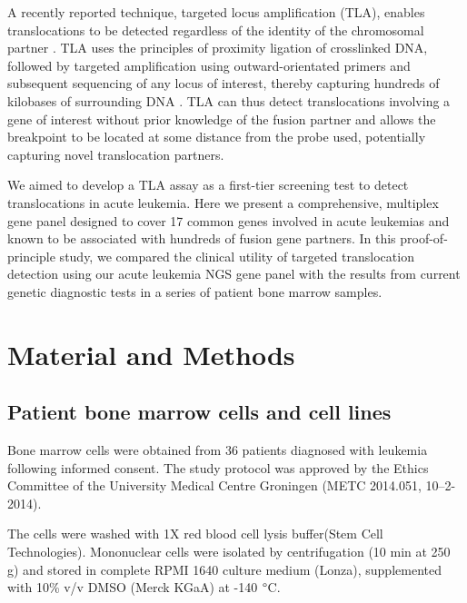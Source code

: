 A recently reported technique, targeted locus amplification (TLA), enables translocations to be detected regardless of the identity of the chromosomal partner \cite{de_Vree_2014}. 
TLA uses the principles of proximity ligation of crosslinked DNA, followed by targeted amplification using outward-orientated primers and subsequent sequencing of any locus of interest, thereby capturing hundreds of kilobases of surrounding DNA \cite{de_Vree_2014}.
TLA can thus detect translocations involving a gene of interest without prior knowledge of the fusion partner and allows the breakpoint to be located at some distance from the probe used, potentially capturing novel translocation partners. 

We aimed to develop a TLA assay as a first-tier screening test to detect translocations in acute leukemia. 
Here we present a comprehensive, multiplex gene panel designed to cover 17 common genes involved in acute leukemias and known to be associated with hundreds of fusion gene partners. 
In this proof-of-principle study, we compared the clinical utility of targeted translocation detection using our acute leukemia NGS gene panel with the results from current genetic diagnostic tests in a series of patient bone marrow samples.


\section{Material and Methods}\label{Material and Methods}

\subsection{Patient bone marrow cells and cell lines}
Bone marrow cells were obtained from 36 patients diagnosed with leukemia following informed consent.
The study protocol was approved by the Ethics Committee of the University Medical Centre Groningen (METC 2014.051, 10–2-2014). 

The cells were washed with 1X red blood cell lysis buffer(Stem Cell Technologies). 
Mononuclear cells were isolated by centrifugation (10 min at 250 g) and stored in complete RPMI 1640 culture medium (Lonza), supplemented with 10\% v/v DMSO (Merck KGaA) at -140 $\degree$C. 

